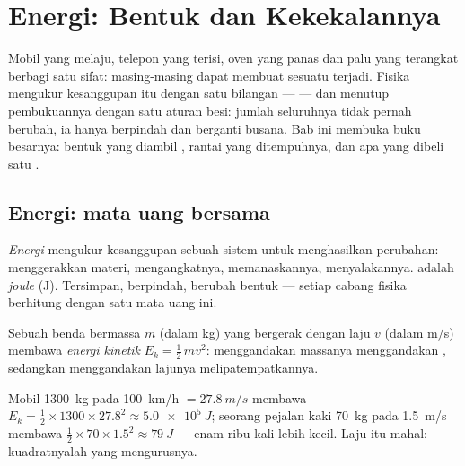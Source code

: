 \chapter{Energi: Bentuk dan Kekekalannya}\label{ch:g10:energy-conservation}

Mobil yang melaju, telepon yang terisi, oven yang panas dan palu yang
terangkat berbagi satu sifat: masing-masing dapat membuat sesuatu
terjadi. Fisika mengukur kesanggupan itu dengan satu bilangan ---
 --- dan menutup pembukuannya dengan satu aturan besi: jumlah
seluruhnya tidak pernah berubah, ia hanya berpindah dan berganti
busana. Bab ini membuka buku besarnya: bentuk yang diambil ,
rantai yang ditempuhnya, dan apa yang dibeli satu .

\section{Energi: mata uang bersama}

\begin{definition}\label{def:g10:energy-conservation:energy}
\emph{Energi} mengukur kesanggupan sebuah sistem untuk
menghasilkan perubahan: menggerakkan materi, mengangkatnya,
memanaskannya, menyalakannya.  adalah
\emph{joule} (\unit{J}). Tersimpan, berpindah, berubah
bentuk --- setiap cabang fisika berhitung dengan satu mata uang ini.
\end{definition}

\begin{definition}\label{def:g10:energy-conservation:kinetic}
Sebuah benda bermassa $m$ (dalam \unit{kg}) yang bergerak dengan laju
$v$ (dalam \unit{m/s}) membawa \emph{energi kinetik} $E_k = \tfrac12\, m v^2$: menggandakan massanya menggandakan
, sedangkan menggandakan lajunya melipatempatkannya.
\end{definition}

\begin{example}\label{ex:g10:energy-conservation:kinetic}
Mobil \qty{1300}{kg} pada \qty{100}{km/h} $= \qty{27.8}{m/s}$ membawa
$E_k = \tfrac12 \times 1300 \times 27.8^2 \approx \qty{5.0e5}{J}$;
seorang pejalan kaki \qty{70}{kg} pada \qty{1.5}{m/s} membawa
$\tfrac12 \times 70 \times 1.5^2 \approx \qty{79}{J}$ --- enam ribu
kali lebih kecil. Laju itu mahal: kuadratnyalah yang mengurusnya.
\end{example}

